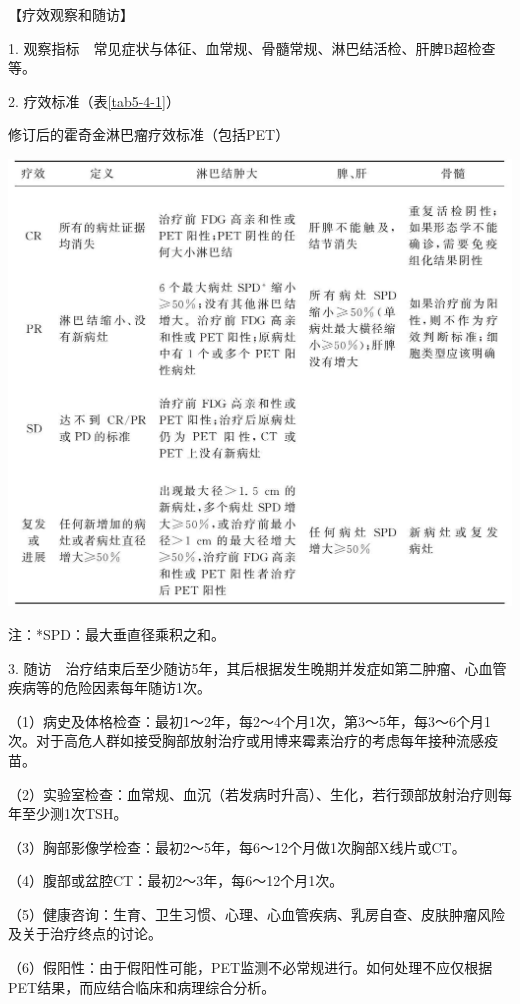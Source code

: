 【疗效观察和随访】

1.
观察指标　常见症状与体征、血常规、骨髓常规、淋巴结活检、肝脾B超检查等。

2. 疗效标准（表\ref{tab5-4-1}）

\begin{table}[htbp]
\centering
\caption{修订后的霍奇金淋巴瘤疗效标准（包括PET）}
\label{tab5-4-1}
\includegraphics{./images/Image00155.jpg}
\end{table}

注：*SPD：最大垂直径乘积之和。

3.
随访　治疗结束后至少随访5年，其后根据发生晚期并发症如第二肿瘤、心血管疾病等的危险因素每年随访1次。

（1）病史及体格检查：最初1～2年，每2～4个月1次，第3～5年，每3～6个月1次。对于高危人群如接受胸部放射治疗或用博来霉素治疗的考虑每年接种流感疫苗。

（2）实验室检查：血常规、血沉（若发病时升高）、生化，若行颈部放射治疗则每年至少测1次TSH。

（3）胸部影像学检查：最初2～5年，每6～12个月做1次胸部X线片或CT。

（4）腹部或盆腔CT：最初2～3年，每6～12个月1次。

（5）健康咨询：生育、卫生习惯、心理、心血管疾病、乳房自查、皮肤肿瘤风险及关于治疗终点的讨论。

（6）假阳性：由于假阳性可能，PET监测不必常规进行。如何处理不应仅根据PET结果，而应结合临床和病理综合分析。

